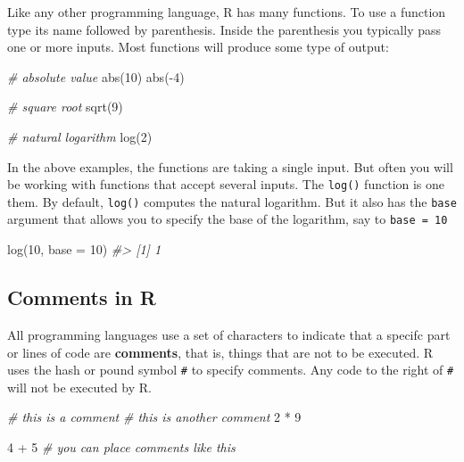 \documentclass[
]{book}
\newenvironment{Shaded}{\begin{snugshade}}{\end{snugshade}}
\newcommand{\AttributeTok}[1]{\textcolor[rgb]{0.77,0.63,0.00}{#1}}
\newcommand{\CommentTok}[1]{\textcolor[rgb]{0.56,0.35,0.01}{\textit{#1}}}
\newcommand{\DecValTok}[1]{\textcolor[rgb]{0.00,0.00,0.81}{#1}}
\newcommand{\FunctionTok}[1]{\textcolor[rgb]{0.00,0.00,0.00}{#1}}
\newcommand{\NormalTok}[1]{#1}
\newcommand{\SpecialCharTok}[1]{\textcolor[rgb]{0.00,0.00,0.00}{#1}}
\begin{document}
Like any other programming language, R has many functions. To use a function
type its name followed by parenthesis. Inside the parenthesis you typically
pass one or more inputs. Most functions will produce some type of output:

\begin{Shaded}
\begin{Highlighting}[]
\CommentTok{\# absolute value}
\FunctionTok{abs}\NormalTok{(}\DecValTok{10}\NormalTok{)}
\FunctionTok{abs}\NormalTok{(}\SpecialCharTok{{-}}\DecValTok{4}\NormalTok{)}

\CommentTok{\# square root}
\FunctionTok{sqrt}\NormalTok{(}\DecValTok{9}\NormalTok{)}

\CommentTok{\# natural logarithm}
\FunctionTok{log}\NormalTok{(}\DecValTok{2}\NormalTok{)}
\end{Highlighting}
\end{Shaded}

In the above examples, the functions are taking a single input. But often you
will be working with functions that accept several inputs. The \texttt{log()} function
is one them. By default, \texttt{log()} computes the natural logarithm. But it also
has the \texttt{base} argument that allows you to specify the base of the logarithm,
say to \texttt{base\ =\ 10}

\begin{Shaded}
\begin{Highlighting}[]
\FunctionTok{log}\NormalTok{(}\DecValTok{10}\NormalTok{, }\AttributeTok{base =} \DecValTok{10}\NormalTok{)}
\CommentTok{\#\textgreater{} [1] 1}
\end{Highlighting}
\end{Shaded}

\hypertarget{comments-in-r}{%
\subsection{Comments in R}\label{comments-in-r}}

All programming languages use a set of characters to indicate that a
specifc part or lines of code are \textbf{comments}, that is, things that are
not to be executed. R uses the hash or pound symbol \texttt{\#} to specify comments.
Any code to the right of \texttt{\#} will not be executed by R.

\begin{Shaded}
\begin{Highlighting}[]
\CommentTok{\# this is a comment}
\CommentTok{\# this is another comment}
\DecValTok{2} \SpecialCharTok{*} \DecValTok{9}

\DecValTok{4} \SpecialCharTok{+} \DecValTok{5}  \CommentTok{\# you can place comments like this}
\end{Highlighting}
\end{Shaded}
\end{document}
